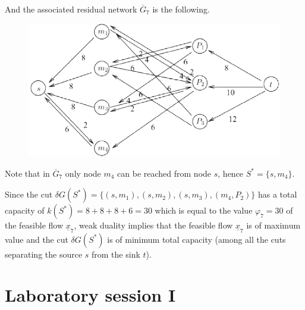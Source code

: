 \documentclass[12pt, a4paper]{report}
\begin{document}
        And the associated residual network $\overline{G}_7$ is the following. 
        \begin{figure}[H]
            \centering
            \includegraphics[width=0.5\linewidth]{images/inflow3.png}
        \end{figure}
        Note that in $\overline{G}_7$ only node $m_4$ can be reached from node $s$, hence $S^{*} = \{s, m_4\}$.
        
        Since the cut $\delta G(S^{*}) = \{(s, m_1),(s, m_2),(s, m_3),(m_4, P_2)\}$ has a total capacity of $k(S^{*}) =8 + 8 + 8 + 6 = 30$ which is equal to the value $\varphi_7 = 30$ of the feasible flow 
        $\underline{x}_7$, weak duality implies that the feasible flow $\underline{x}_7$ is of maximum value and the cut $\delta G(S^{*})$ is of minimum total capacity (among all the cuts separating the source 
        $s$ from the sink $t$).

\newpage

\chapter{Laboratory session I}
\end{document}
